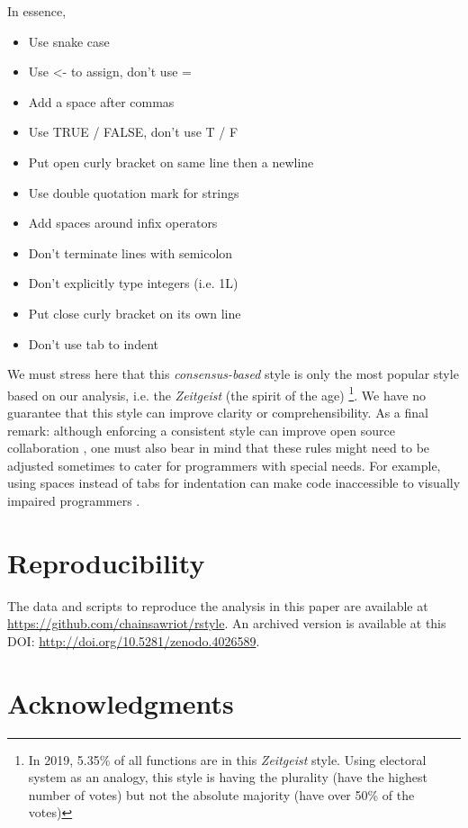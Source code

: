 In essence,

\begin{itemize}
  \item Use snake case
  \item Use <- to assign, don't use =
  \item Add a space after commas
  \item Use TRUE / FALSE, don't use T / F
  \item Put open curly bracket on same line then a newline
  \item Use double quotation mark for strings
  \item Add spaces around infix operators
  \item Don't terminate lines with semicolon
  \item Don’t explicitly type integers (i.e. 1L)
  \item Put close curly bracket on its own line
  \item Don't use tab to indent
\end{itemize}

We must stress here that this \emph{consensus-based} style is only the most popular style based on our analysis, i.e. the \emph{Zeitgeist} (the spirit of the age) \footnote{In 2019, 5.35\% of all functions are in this \emph{Zeitgeist} style. Using electoral system as an analogy, this style is having the plurality (have the highest number of votes) but not the absolute majority (have over 50\% of the votes)}. We have no guarantee that this style can improve clarity or comprehensibility. As a final remark: although enforcing a consistent style can improve open source collaboration \citep{wang}, one must also bear in mind that these rules might need to be adjusted sometimes to cater for programmers with special needs. For example, using spaces instead of tabs for indentation can make code inaccessible to visually impaired programmers \citep{mosal}.

\section{Reproducibility}

The data and scripts to reproduce the analysis in this paper are available at \url{https://github.com/chainsawriot/rstyle}. An archived version is available at this DOI: \url{http://doi.org/10.5281/zenodo.4026589}.

\section{Acknowledgments}

